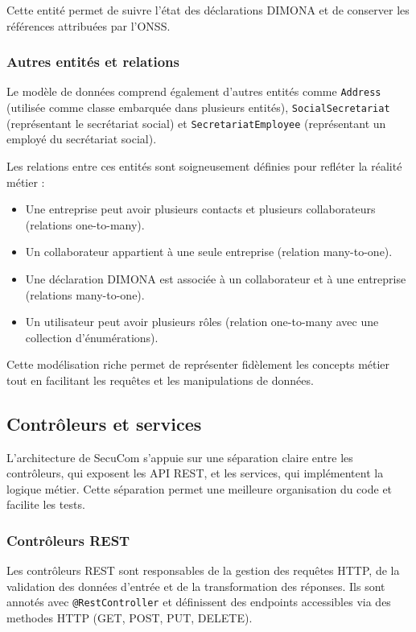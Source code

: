 \documentclass[12pt,a4paper]{report}
\begin{document}
Cette entité permet de suivre l'état des déclarations DIMONA et de conserver les références attribuées par l'ONSS.

\subsubsection{Autres entités et relations}

Le modèle de données comprend également d'autres entités comme \texttt{Address} (utilisée comme classe embarquée dans plusieurs entités), \texttt{SocialSecretariat} (représentant le secrétariat social) et \texttt{SecretariatEmployee} (représentant un employé du secrétariat social).

Les relations entre ces entités sont soigneusement définies pour refléter la réalité métier :
\begin{itemize}
  \item Une entreprise peut avoir plusieurs contacts et plusieurs collaborateurs (relations one-to-many).
  \item Un collaborateur appartient à une seule entreprise (relation many-to-one).
  \item Une déclaration DIMONA est associée à un collaborateur et à une entreprise (relations many-to-one).
  \item Un utilisateur peut avoir plusieurs rôles (relation one-to-many avec une collection d'énumérations).
\end{itemize}

Cette modélisation riche permet de représenter fidèlement les concepts métier tout en facilitant les requêtes et les manipulations de données.

\subsection{Contrôleurs et services}

L'architecture de SecuCom s'appuie sur une séparation claire entre les contrôleurs, qui exposent les API REST, et les services, qui implémentent la logique métier. Cette séparation permet une meilleure organisation du code et facilite les tests.

\subsubsection{Contrôleurs REST}

Les contrôleurs REST sont responsables de la gestion des requêtes HTTP, de la validation des données d'entrée et de la transformation des réponses. Ils sont annotés avec \texttt{@RestController} et définissent des endpoints accessibles via des methodes HTTP (GET, POST, PUT, DELETE).
\end{document}
